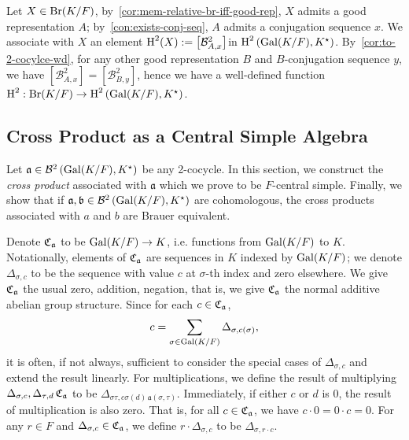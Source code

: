 \begin{construction}\label{con:br-to-snd-coh}
  Let $X \in \operatorname{Br}(K/F)$, by~\cref{cor:mem-relative-br-iff-good-rep}, $X$ admits a good representation $A$; by~\cref{con:exists-conj-seq}, $A$ admits a conjugation sequence $x$. We associate with $X$ an element $\operatorname{H}^{2}(X) := \left[\mathcal{B}^{2}_{A,x}\right]$in $\operatorname{H}^{2}\left(\operatorname{Gal}(K/F),K^{\star}\right)$. By~\cref{cor:to-2-cocylce-wd}, for any other good representation $B$ and $B$-conjugation sequence $y$, we have $\left[\mathcal{B}^{2}_{A,x}\right]=\left[\mathcal{B}^{2}_{B,y}\right]$, hence we have a well-defined function $\operatorname{H}^{2} : \operatorname{Br}(K/F) \to \operatorname{H}^{2}\left(\operatorname{Gal}(K/F),K^{\star}\right)$.
  \leanok
\end{construction}

\subsection{Cross Product as a Central Simple Algebra}

Let $\mathfrak{a} \in \mathcal{B}^{2}\left(\operatorname{Gal}(K/F), K^{\star}\right)$ be any 2-cocycle. In this section, we construct the {\em cross product\/} associated with $\mathfrak{a}$ which we prove to be $F$-central simple. Finally, we show that if $\mathfrak{a}, \mathfrak{b}\in\mathcal{B}^{2}\left(\operatorname{Gal}(K/F), K^{\star}\right)$ are cohomologous, the cross products associated with $a$ and $b$ are Brauer equivalent.

\begin{construction}\label{con:cross-product}
  Denote $\operatorname{\mathfrak{C}}_{\mathfrak{a}}$ to be $\operatorname{Gal}(K/F) \to K$, i.e. functions from $\operatorname{Gal}(K/F)$ to $K$. Notationally, elements of $\operatorname{\mathfrak{C}}_{\mathfrak{a}}$ are sequences in $K$ indexed by $\operatorname{Gal}(K/F)$; we denote $\Delta_{\sigma, c}$ to be the sequence with value $c$ at $\sigma$-th index and zero elsewhere. We give $\operatorname{\mathfrak{C}}_{\mathfrak{a}}$ the usual zero, addition, negation, that is, we give $\operatorname{\mathfrak{C}}_{\mathfrak{a}}$ the normal additive abelian group structure. Since for each $c \in \operatorname{\mathfrak{C}}_{\mathfrak{a}}$,
  \[
    c = \sum_{\sigma\in\operatorname{Gal}(K/F)}\Delta_{\sigma, c(\sigma)},
    \]
    it is often, if not always, sufficient to consider the special cases of $\Delta_{\sigma, c}$ and extend the result linearly.
  For multiplications, we define the result of multiplying $\Delta_{\sigma, c},\Delta_{\tau, d} \operatorname{\mathfrak{C}}_{\mathfrak{a}}$ to be $\Delta_{\sigma\tau, c\sigma(d)\, \mathfrak{a}(\sigma,\tau)}$. Immediately, if either $c$ or $d$ is $0$, the result of multiplication is also zero. That is, for all $c \in \operatorname{\mathfrak{C}}_{\mathfrak{a}}$, we have $c\cdot 0=0\cdot c =0$. For any $r \in F$ and $\Delta_{\sigma, c} \in \operatorname{\mathfrak{C}}_{\mathfrak{a}}$, we define $r \cdot \Delta_{\sigma, c}$ to be $\Delta_{\sigma, r\cdot c}$.
  \leanok
\end{construction}

